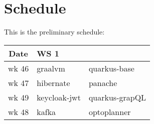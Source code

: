 \section*{Schedule}

This is the preliminary schedule:

\begin{center}
  \begin{tabular}{|c|l|l|}\hline
    \textbf{Date}& \textbf{WS 1}\\\hline
    wk 46 & graalvm & quarkus-base\\\hline
    wk 47 & hibernate & panache\\\hline
    wk 49 & keycloak-jwt & quarkus-grapQL\\\hline
    wk 48 & kafka & optoplanner\\\hline
  \end{tabular}
\end{center}

